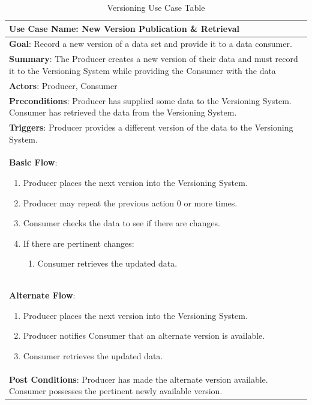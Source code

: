 \begin{table}
	\caption{Versioning Use Case Table}
	\label{table:UseCase}
	\centering
	\begin{tabular}{|L{14cm}|}
		\hline
		\textbf{Use Case Name}: New Version Publication \& Retrieval\\
		\hline
		\textbf{Goal}: Record a new version of a data set and provide it to a data consumer.\\
		\hline
		\textbf{Summary}: The Producer creates a new version of their data and must record it to the Versioning System while providing the Consumer with the data\\
		\hline
		\textbf{Actors}: Producer, Consumer\\
		\hline
		\textbf{Preconditions}: Producer has supplied some data to the Versioning System.   Consumer has retrieved the data from the Versioning System.\\
		\hline
		\textbf{Triggers}: Producer provides a different version of the data to the Versioning System.\\
		\hline
		\textbf{Basic Flow}: 
		\begin{enumerate}
			\item Producer places the next version into the Versioning System.
			\item Producer may repeat the previous action 0 or more times.
			\item Consumer checks the data to see if there are changes.
			\item If there are pertinent changes:
			\begin{enumerate}
				\item Consumer retrieves the updated data.
			\end{enumerate}
		\end{enumerate}\\
		\hline
		\textbf{Alternate Flow}:
		\begin{enumerate}
			\item Producer places the next version into the Versioning System.
			\item Producer notifies Consumer that an alternate version is available.
			\item Consumer retrieves the updated data.
		\end{enumerate}\\
		\hline
		\textbf{Post Conditions}: Producer has made the alternate version available.  Consumer possesses the pertinent newly available version.\\
		\hline
	\end{tabular}
\end{table}

